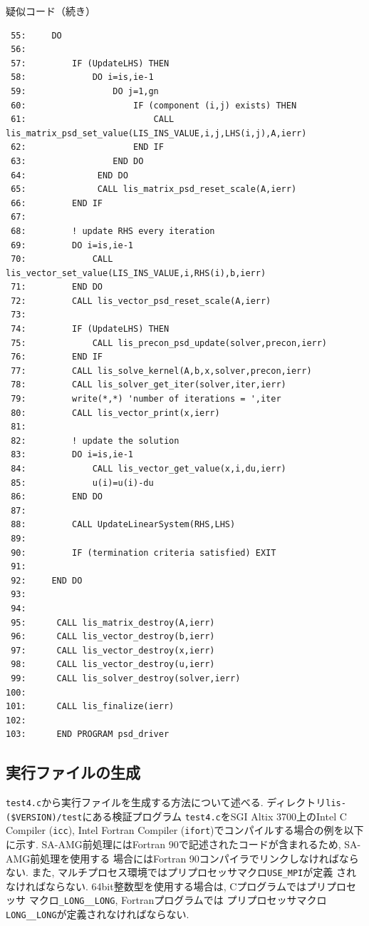 \documentclass[a4paper]{jarticle}
\begin{document}
{{\begin{itembox}[l]{疑似コード（続き）}
{\small
\begin{verbatim}
 55:     DO
 56:
 57:         IF (UpdateLHS) THEN
 58:             DO i=is,ie-1
 59:                 DO j=1,gn
 60:                     IF (component (i,j) exists) THEN
 61:                         CALL lis_matrix_psd_set_value(LIS_INS_VALUE,i,j,LHS(i,j),A,ierr)
 62:                     END IF
 63:                 END DO
 64:              END DO
 65:              CALL lis_matrix_psd_reset_scale(A,ierr)
 66:         END IF
 67:
 68:         ! update RHS every iteration
 69:         DO i=is,ie-1
 70:             CALL lis_vector_set_value(LIS_INS_VALUE,i,RHS(i),b,ierr)
 71:         END DO
 72:         CALL lis_vector_psd_reset_scale(A,ierr)
 73:
 74:         IF (UpdateLHS) THEN
 75:             CALL lis_precon_psd_update(solver,precon,ierr)
 76:         END IF
 77:         CALL lis_solve_kernel(A,b,x,solver,precon,ierr)
 78:         CALL lis_solver_get_iter(solver,iter,ierr)
 79:         write(*,*) 'number of iterations = ',iter
 80:         CALL lis_vector_print(x,ierr)
 81:
 82:         ! update the solution
 83:         DO i=is,ie-1
 84:             CALL lis_vector_get_value(x,i,du,ierr)
 85:             u(i)=u(i)-du
 86:         END DO
 87:
 88:         CALL UpdateLinearSystem(RHS,LHS)
 89:
 90:         IF (termination criteria satisfied) EXIT
 91:
 92:     END DO
 93:
 94:
 95:      CALL lis_matrix_destroy(A,ierr)
 96:      CALL lis_vector_destroy(b,ierr)
 97:      CALL lis_vector_destroy(x,ierr)
 98:      CALL lis_vector_destroy(u,ierr)
 99:      CALL lis_solver_destroy(solver,ierr)
100:
101:      CALL lis_finalize(ierr)
102:
103:      END PROGRAM psd_driver
\end{verbatim}
}
\end{itembox}

\newpage
\subsection{実行ファイルの生成}
\verb|test4.c|から実行ファイルを生成する方法について述べる. 
ディレクトリ\verb|lis-($VERSION)/test|にある検証プログラム
\verb|test4.c|をSGI Altix 3700上のIntel C Compiler (\verb|icc|), 
Intel Fortran Compiler (\verb|ifort|)でコンパイルする場合の例を以下に示す.  
SA-AMG前処理にはFortran 90で記述されたコードが含まれるため, SA-AMG前処理を使用する
場合にはFortran 90コンパイラでリンクしなければならない. 
また, マルチプロセス環境ではプリプロセッサマクロ\verb|USE_MPI|が定義
されなければならない. 
64bit整数型を使用する場合は, Cプログラムではプリプロセッサ
マクロ{\tt \_LONG\_\_LONG}, Fortranプログラムでは
プリプロセッサマクロ{\tt LONG\_\_LONG}が定義されなければならない. 

}}
\end{document}
